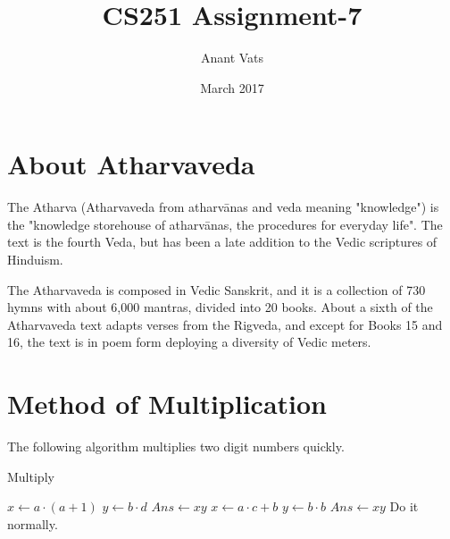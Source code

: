 \documentclass{article}
\title{CS251 Assignment-7}
\author{Anant Vats }
\date{March 2017}
\begin{document}
\maketitle
\section{About Atharvaveda}
The Atharva (Atharvaveda from atharvānas and veda meaning "knowledge") is the "knowledge storehouse of atharvānas, the procedures for everyday life". The text is the fourth Veda, but has been a late addition to the Vedic scriptures of Hinduism.\cite{wikicite1}

The Atharvaveda is composed in Vedic Sanskrit, and it is a collection of 730 hymns with about 6,000 mantras, divided into 20 books. About a sixth of the Atharvaveda text adapts verses from the Rigveda, and except for Books 15 and 16, the text is in poem form deploying a diversity of Vedic meters.\cite{wikicite1} 

\section{Method of Multiplication}
The following algorithm multiplies two digit numbers quickly.
\begin{algorithm}
\caption{Multiply}\label{Merge}
\begin{algorithmic}[1]
  
\State $x\gets a\cdot (a+1)$
\State $y\gets b\cdot d$
\State $Ans\gets xy$
\EndIf
{} 
\State $x\gets a\cdot c+b$
\State$y\gets b\cdot b$
\State$Ans\gets xy$
\Else
\State Do it normally.
\EndIf
\EndProcedure
\Statex

\end{algorithmic}
\end{algorithm}
\end{document}
